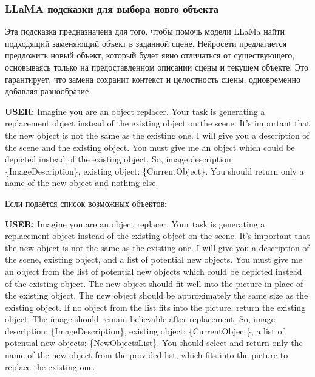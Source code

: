 \documentclass[11pt]{article}
\begin{document}
\subsubsection{LLaMA подсказки для выбора новго объекта}

Эта подсказка предназначена для того, чтобы помочь модели LLaMa найти подходящий заменяющий объект в заданной сцене. Нейросети предлагается предложить новый объект, который будет явно отличаться от существующего, основываясь только на предоставленном описании сцены и текущем объекте. Это гарантирует, что замена сохранит контекст и целостность сцены, одновременно добавляя разнообразие.

\begin{tcolorbox}[
  colback=lightgray, %
  boxrule=1pt, %
]\textbf{USER:} Imagine you are an object replacer. Your task is generating a replacement object instead of the existing object on the scene. It's important that the new object is not the same as the existing one. I will give you a description of the scene and the existing object. You must give me an object which could be depicted instead of the existing object.
So, image description: \{ImageDescription\}, existing object: \{CurrentObject\}.
You should return only a name of the new object and nothing else.\\
\end{tcolorbox}

Если подаётся список возможных объектов:
\begin{tcolorbox}[
  colback=lightgray, %
  boxrule=1pt, %
]\textbf{USER:} Imagine you are an object replacer. Your task is generating a replacement object instead of the existing object on the scene. It's important that the new object is not the same as the existing one. I will give you a description of the scene, existing object, and a list of potential new objects. You must give me an object from the list of potential new objects which could be depicted instead of the existing object. The new object should fit well into the picture in place of the existing object. The new object should be approximately the same size as the existing object. If no object from the list fits into the picture, return the existing object. The image should remain believable after replacement.
So, image description: \{ImageDescription\}, existing object: \{CurrentObject\}, a list of potential new objects: \{NewObjectsList\}.
You should select and return only the name of the new object from the provided list, which fits into the picture to replace the existing one.\\
\end{tcolorbox}
\end{document}
